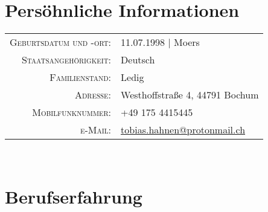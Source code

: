 \documentclass[10pt,a4paper]{article}
\begin{document}
%
%
\par{
	\bigskip\par
}


%
%
%
\section{Pers\"ohnliche Informationen}

\begin{tabular}{rl}
    \textsc{Geburtsdatum und -ort:}	& 11.07.1998 | Moers \\
    \textsc{Staatsangeh\"origkeit:}	& Deutsch \\
    \textsc{Familienstand:}			& Ledig \\
    \textsc{Adresse:}				& Westhoffstraße 4, 44791 Bochum \\
    \textsc{Mobilfunknummer:}		& +49 175 4415445 \\
    \textsc{e-Mail:}				& \href{mailto:tobias.hahnen@protonmail.ch}{tobias.hahnen@protonmail.ch}
\end{tabular} \\


\section{Berufserfahrung}
\end{document}
